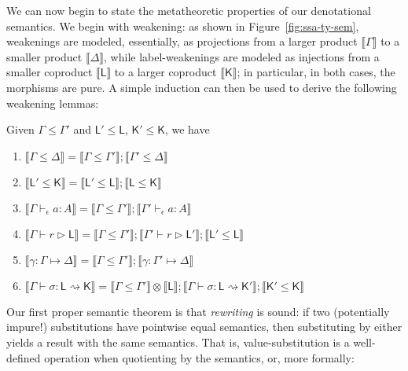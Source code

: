 \documentclass[acmsmall,screen,review]{acmart}
\newcommand{\ms}[1]{\ensuremath{\mathsf{#1}}}
\newcommand{\hasty}[4]{#1 \vdash_{#2} #3: {#4}}
\newcommand{\haslb}[3]{#1 \vdash #2 \rhd #3}
\newcommand{\issubst}[3]{#1: #2 \mapsto #3}
\newcommand{\lbsubst}[4]{#1 \vdash #2: #3 \rightsquigarrow #4}
\newcommand{\dnt}[1]{\llbracket{#1}\rrbracket}
\begin{document}
We can now begin to state the metatheoretic properties of our denotational semantics. We begin with
weakening: as shown in Figure~\ref{fig:ssa-ty-sem}, weakenings are modeled, essentially, as
projections from a larger product $\dnt{\Gamma}$ to a smaller product $\dnt{\Delta}$, while
label-weakenings are modeled as injections from a smaller coproduct $\dnt{\ms{L}}$ to a larger
coproduct $\dnt{\ms{K}}$; in particular, in both cases, the morphisms are pure.  A simple induction
can then be used to derive the following weakening lemmas:
\begin{lemma}
  Given $\Gamma \leq \Gamma'$ and $\ms{L}' \leq \ms{L}$, $\ms{K}' \leq \ms{K}$, we have
  \begin{enumerate}[label=(\alph*)]
    \item $\dnt{\Gamma \leq \Delta} = \dnt{\Gamma \leq \Gamma'};\dnt{\Gamma' \leq \Delta}$
    \item $\dnt{\ms{L}' \leq \ms{K}} = \dnt{\ms{L}' \leq \ms{L}};\dnt{\ms{L} \leq \ms{K}}$
    \item $\dnt{\hasty{\Gamma}{\epsilon}{a}{A}} 
      = \dnt{\Gamma \leq \Gamma'};\dnt{\hasty{\Gamma'}{\epsilon}{a}{A}}$
    \item $\dnt{\haslb{\Gamma}{r}{\ms{L}}}
      = \dnt{\Gamma \leq \Gamma'}
      ; \dnt{\haslb{\Gamma'}{r}{\ms{L}'}}
      ; \dnt{\ms{L}' \leq \ms{L}}$
    \item $\dnt{\issubst{\gamma}{\Gamma}{\Delta}}
      = \dnt{\Gamma \leq \Gamma'};\dnt{\issubst{\gamma}{\Gamma'}{\Delta}}$
    \item $\dnt{\lbsubst{\Gamma}{\sigma}{\ms{L}}{\ms{K}}}
      = \dnt{\Gamma \leq \Gamma'} \otimes \dnt{\ms{L}}
      ; \dnt{\lbsubst{\Gamma}{\sigma}{\ms{L}}{\ms{K}'}}
      ; \dnt{\ms{K}' \leq \ms{K}}
      $
  \end{enumerate}
\end{lemma}

Our first proper semantic theorem is that \emph{rewriting} is sound: if two (potentially impure!)
substitutions have pointwise equal semantics, then substituting by either yields a result with
the same semantics. That is, value-substitution is a well-defined operation when quotienting by the
semantics, or, more formally:
\end{document}
